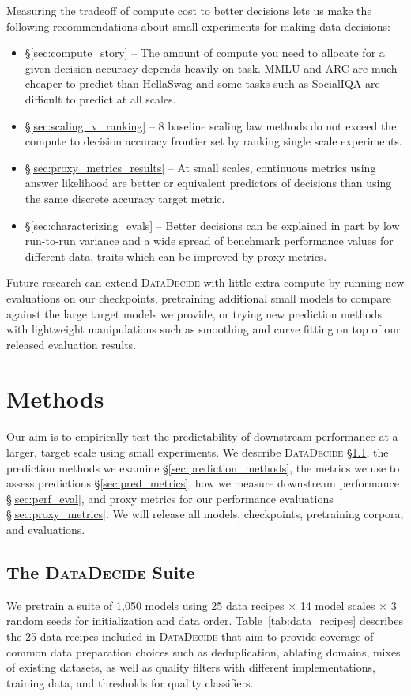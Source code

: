 \documentclass{article}
\theoremstyle{plain}
\theoremstyle{definition}
\theoremstyle{remark}
\newcommand{\numRecipes}{25}
\newcommand{\numScales}{14}
\newcommand{\numSuiteModels}{1,050} %
\newcommand{\numTargetSeeds}{3}
\newcommand{\projSuite}{\textsc{DataDecide}}
\newcommand{\arc}{ARC}
\newcommand{\hellaswag}{HellaSwag}
\newcommand{\mmlu}{MMLU}
\newcommand{\socialiqa}{SocialIQA}
\newcommand{\twoClass}{decision accuracy}
\newcommand{\rankingMethod}{ranking single scale experiments}
\newcommand{\numScalingLaws}{8}
\begin{document}
Measuring the tradeoff of compute cost to better decisions lets us make the following recommendations about small experiments for making data decisions:
\begin{itemize}
    \item \S\ref{sec:compute_story} -- The amount of compute you need to allocate for a given \twoClass{} depends heavily on task. \mmlu{} and \arc{} are much cheaper to predict than \hellaswag{} and some tasks such as \socialiqa{} are difficult to predict at all scales. 
    \item \S\ref{sec:scaling_v_ranking} -- \numScalingLaws{} baseline scaling law methods do not exceed the compute to decision accuracy frontier set by \rankingMethod{}. 
    \item \S\ref{sec:proxy_metrics_results} -- At small scales, continuous metrics using answer likelihood are better or equivalent predictors of decisions than using the same discrete accuracy target metric.
    \item \S\ref{sec:characterizing_evals} -- Better decisions can be explained in part by low run-to-run variance and a wide spread of benchmark performance values for different data, traits which can be improved by proxy metrics.
\end{itemize}

Future research can extend \projSuite{} with little extra compute by running new evaluations on our checkpoints, pretraining additional small models to compare against the large target models we provide, or trying new prediction methods with lightweight manipulations such as smoothing and curve fitting on top of our released evaluation results.


\section{Methods}
Our aim is to empirically test the predictability of downstream performance at a larger, target scale using small experiments. We describe \projSuite{} \S\ref{sec:suite}, the prediction methods we examine \S\ref{sec:prediction_methods}, the metrics we use to assess predictions \S\ref{sec:pred_metrics}, how we measure downstream performance \S\ref{sec:perf_eval}, and proxy metrics for our performance evaluations \S\ref{sec:proxy_metrics}.
We will release all models, checkpoints, pretraining corpora, and evaluations.

\subsection{The \projSuite{} Suite}
\label{sec:suite}
We pretrain a suite of \numSuiteModels{} models using \numRecipes{} data recipes $\times$ \numScales{} model scales  $\times$ \numTargetSeeds{} random seeds for initialization and data order. Table~\ref{tab:data_recipes} describes the \numRecipes{} data recipes included in \projSuite{} that aim to provide coverage of common data preparation choices such as deduplication, ablating domains, mixes of existing datasets, as well as quality filters with different implementations, training data, and thresholds for quality classifiers.
\end{document}
